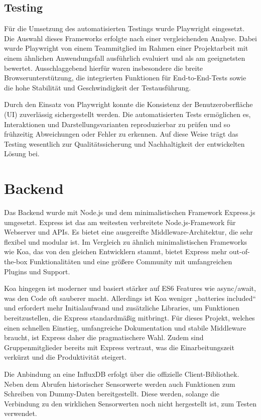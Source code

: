 \subsection{Testing}
Für die Umsetzung des automatisierten Testings wurde Playwright eingesetzt. Die Auswahl dieses Frameworks erfolgte nach einer vergleichenden Analyse. Dabei wurde Playwright von einem Teammitglied im Rahmen einer Projektarbeit mit einem ähnlichen Anwendungsfall ausführlich evaluiert und als am geeignetsten bewertet. Ausschlaggebend hierfür waren insbesondere die breite Browserunterstützung, die integrierten Funktionen für End-to-End-Tests sowie die hohe Stabilität und Geschwindigkeit der Testausführung.

Durch den Einsatz von Playwright konnte die Konsistenz der Benutzeroberfläche (UI) zuverlässig sichergestellt werden. Die automatisierten Tests ermöglichen es, Interaktionen und Darstellungsvarianten reproduzierbar zu prüfen und so frühzeitig Abweichungen oder Fehler zu erkennen. Auf diese Weise trägt das Testing wesentlich zur Qualitätssicherung und Nachhaltigkeit der entwickelten Lösung bei.



\section{Backend}
Das Backend wurde mit Node.js und dem minimalistischen Framework Express.js umgesetzt. 
Express ist das am weitesten verbreitete Node.js-Framework für Webserver und APIs. 
Es bietet eine ausgereifte Middleware-Architektur, die sehr flexibel und modular ist. 
Im Vergleich zu ähnlich minimalistischen Frameworks wie Koa, 
das von den gleichen Entwicklern stammt, 
bietet Express mehr out-of-the-box Funktionalitäten und eine größere Community mit umfangreichen Plugins und Support. \cite{betterstack2025koavsexpress,appventurez2025nodejsframework}

Koa hingegen ist moderner und basiert stärker auf ES6 Features wie async/await, was den Code oft sauberer macht. 
Allerdings ist Koa weniger „batteries included“ und erfordert mehr Initialaufwand und zusätzliche Libraries, 
um Funktionen bereitzustellen, die Express standardmäßig mitbringt. 
Für dieses Projekt, welches einen schnellen Einstieg, umfangreiche Dokumentation und stabile Middleware braucht, 
ist Express daher die pragmatischere Wahl.
Zudem sind Gruppenmitglieder bereits mit Express vertraut, was die Einarbeitungszeit verkürzt und die Produktivität steigert. 

Die Anbindung an eine InfluxDB erfolgt über die offizielle Client-Bibliothek. 
Neben dem Abrufen historischer Sensorwerte werden auch Funktionen zum Schreiben von Dummy-Daten bereitgestellt.
Diese werden, solange die Verbindung zu den wirklichen Sensorwerten noch nicht hergestellt ist, zum Testen verwendet.


